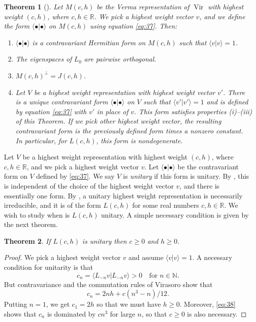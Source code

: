 \documentclass[a4paper, 12pt, reqno]{amsart}
\newtheorem{theorem}{Theorem}[section]
\theoremstyle{remark}
\DeclareMathOperator{\Vir}{Vir}
\begin{document}
\begin{theorem}[{\cite[Proposition 3.4]{kac_bombay_2013}}]
  \label{thr:30}
  Let $M(c, h)$ be the Verma representation of $\Vir$ with highest weight $(c, h)$, where $c, h \in \mathbb{R}$.
  We pick a highest weight vector $v$, and we define the form $\langle\bullet| \bullet\rangle$ on $M(c, h)$ using equation \eqref{eq:37}.
  Then:
  \begin{enumerate}
  \item $\langle\bullet| \bullet\rangle$ is a contravariant Hermitian form on $M(c, h)$ such that $\langle v| v\rangle = 1$.
  \item The eigenspaces of $L_0$ are pairwise orthogonal.
  \item $M(c, h)^{\perp} = J(c, h)$.
  \item Let $V$ be a highest weight representation with highest weight vector $v'$.
    There is a unique contravariant form $\langle\bullet| \bullet\rangle$ on $V$ such that $\langle v'| v'\rangle = 1$ and is defined by equation \eqref{eq:37} with $v'$ in place of $v$.
    This form satisfies properties \emph{(i)--(iii)} of this Theorem.
    If we pick other highest weight vector, the resulting contravariant form is the previously defined form times a nonzero constant.
    In particular, for $L(c, h)$, this form is nondegenerate.
  \end{enumerate}
\end{theorem}

Let $V$ be a highest weight representation with highest weight $(c, h)$, where $c, h \in \mathbb{R}$, and we pick a highest weight vector $v$.
Let $\langle\bullet| \bullet\rangle$ be the contravariant form on $V$ defined by \eqref{eq:37}.
We say $V$ is \emph{unitary} if this form is unitary.
By , this is independent of the choice of the highest weight vector $v$, and there is essentially one form.
By , a unitary highest weight representation is necessarily irreducible, and it is of the form $L(c, h)$ for some real numbers $c, h \in \mathbb{R}$.
We wish to study when is $L(c, h)$ unitary.
A simple necessary condition is given by the next theorem.

\begin{theorem}
  \label{thr:31}
  If $L(c, h)$ is unitary then $c \ge 0$ and $h \ge 0$.
\end{theorem}

\begin{proof}
  We pick a highest weight vector $v$ and assume $\langle v| v\rangle = 1$.
  A necessary condition for unitarity is that
  \begin{equation*}
    c_n = \langle L_{-n}v| L_{-n}v\rangle > 0 \quad \text{for $n \in \mathbb{N}$}.
  \end{equation*}
  But contravariance and the commutation rules of Virasoro show that
  \begin{equation}
    \label{eq:38}
    c_n = 2nh + c(n^3 - n)/12.
  \end{equation}
  Putting $n = 1$, we get $c_1 = 2h$ so that we must have $h \ge 0$.
  Moreover, \eqref{eq:38} shows that $c_n$ is dominated by $cn^3$ for large $n$, so that $c \ge 0$ is also necessary.
\end{proof}
\end{document}
